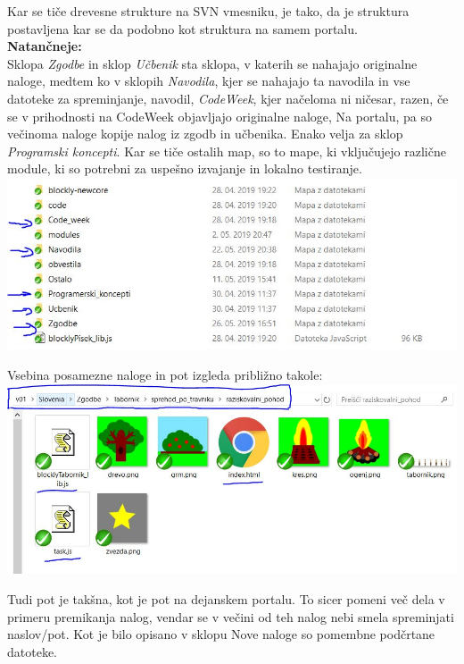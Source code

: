 \documentclass[11pt]{article} %
\begin{document}
Kar se tiče drevesne strukture na SVN vmesniku, je tako, da je struktura postavljena kar se da podobno kot struktura na samem portalu.\\
\textbf{Natančneje:} \\[0.5cm]
Sklopa \textit{Zgodbe} in sklop \textit{Učbenik} sta sklopa, v katerih se nahajajo originalne naloge, medtem ko v  sklopih \textit{Navodila}, kjer se nahajajo ta navodila in vse datoteke za spreminjanje, navodil, \textit{CodeWeek}, kjer načeloma ni ničesar, razen, če se v prihodnosti na CodeWeek objavljajo originalne naloge, Na portalu, pa so večinoma naloge kopije nalog iz zgodb in učbenika. Enako velja za sklop \textit{Programski koncepti}. Kar se tiče ostalih map, so to mape, ki vključujejo različne module, ki so potrebni za uspešno izvajanje in lokalno testiranje.\\
\includegraphics[scale=0.5]{svn_slovenia}


Vsebina posamezne naloge in pot izgleda približno takole:\\
\includegraphics[scale=0.5]{svn_naloga}

Tudi pot je takšna, kot je pot na dejanskem portalu. To sicer pomeni več dela v primeru premikanja nalog, vendar se v večini od teh nalog nebi smela spreminjati naslov/pot. Kot je bilo opisano v sklopu Nove naloge so pomembne podčrtane datoteke.
\pagebreak
\end{document}
